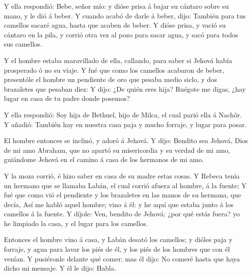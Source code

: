  Y ella respondió: Bebe, señor mío: y dióse prisa á bajar
su cántaro sobre su mano, y le dió á beber.  Y cuando acabó
de darle á beber, dijo: También para tus camellos sacaré agua, hasta que
acaben de beber.  Y dióse prisa, y vació su cántaro en la
pila, y corrió otra vez al pozo para sacar agua, y sacó para todos sus
camellos.

 Y el hombre estaba maravillado de ella, callando, para
saber si Jehová había prosperado ó no su viaje.  Y fué que
como los camellos acabaron de beber, presentóle el hombre un pendiente
de oro que pesaba medio siclo, y dos brazaletes que pesaban diez:
 Y dijo: ¿De quién eres hija? Ruégote me digas, ¿hay lugar
en casa de tu padre donde posemos?

 Y ella respondió: Soy hija de Bethuel, hijo de Milca, el
cual parió ella á Nachôr.  Y añadió: También hay en nuestra
casa paja y mucho forraje, y lugar para posar.

 El hombre entonces se inclinó, y adoró á Jehová.
 Y dijo: Bendito sea Jehová, Dios de mi amo Abraham, que no
apartó su misericordia y su verdad de mi amo, guiándome Jehová en el
camino á casa de los hermanos de mi amo.

 Y la moza corrió, é hizo saber en casa de su madre estas
cosas.  Y Rebeca tenía un hermano que se llamaba Labán, el
cual corrió afuera al hombre, á la fuente;  Y fué que como
vió el pendiente y los brazaletes en las manos de su hermana, que decía,
Así me habló aquel hombre; vino á él: y he aquí que estaba junto á los
camellos á la fuente.  Y díjole: Ven, bendito de Jehová;
¿por qué estás fuera? yo he limpiado la casa, y el lugar para los
camellos.

 Entonces el hombre vino á casa, y Labán desató los
camellos; y dióles paja y forraje, y agua para lavar los piés de él, y
los piés de los hombres que con él venían.  Y pusiéronle
delante qué comer; mas él dijo: No comeré hasta que haya dicho mi
mensaje. Y él le dijo: Habla.

